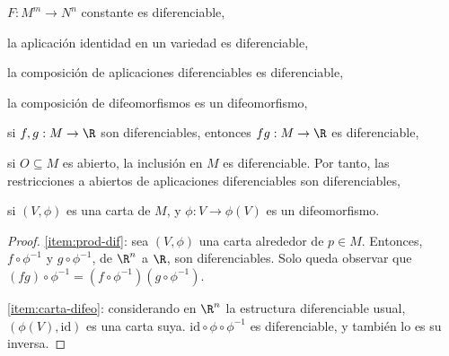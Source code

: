 \begin{nprop} \label{prop:propiedades-dif}
  \hfill
  \begin{nlist}
  \item
    $F:M^{m}\to N^{n}$ constante es diferenciable,
  \item
    la aplicación identidad en un variedad es diferenciable,
  \item
    la composición de aplicaciones diferenciables es diferenciable,
  \item
    la composición de difeomorfismos es un difeomorfismo,
  \item \label{item:prod-dif}
    si $f,g: M\to\R$ son diferenciables, entonces $fg: M\to\R$ es
    diferenciable,
  \item
    si $O\subseteq M$ es abierto, la inclusión en $M$ es diferenciable. Por
    tanto, las restricciones a abiertos de aplicaciones diferenciables son
    diferenciables,
  \item \label{item:carta-difeo}
    si $(V,\phi)$ es una carta de $M$, y $\phi: V\to \phi(V)$ es un difeomorfismo.
  \end{nlist}
\end{nprop}
\begin{proof}
  \ref{item:prod-dif}: sea $(V,\phi)$ una carta alrededor de $p\in M$. Entonces,
  $f\circ \phi^{-1}$ y $g\circ \phi^{-1}$, de $\R^{n}$ a $\R$, son
  diferenciables. Solo queda observar que
  $(fg)\circ\phi^{-1} = (f\circ\phi^{-1})(g\circ\phi^{-1})$.
  
  \ref{item:carta-difeo}: considerando en $\R^{n}$ la estructura diferenciable
  usual, $(\phi(V),\mathrm{id})$ es una carta suya. $\mathrm{id}\circ
  \phi\circ\phi^{-1}$ es diferenciable, y también lo es su inversa.
\end{proof}

